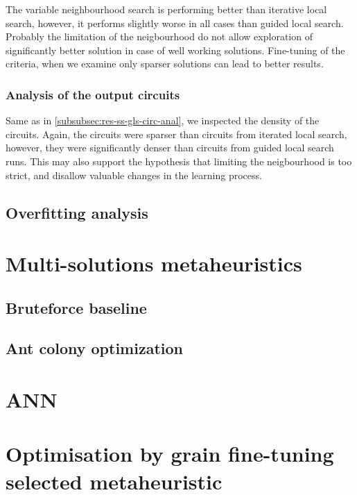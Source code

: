 \documentclass[
  print, %
  Table,   %
  nolof,     %
  nolot,     %
  11pt, %
  oneside  %
]{fithesis3}
\begin{document}
The variable neighbourhood search is performing better than iterative local search, however, it performs slightly worse in all cases than guided local search. Probably the limitation of the neigbourhood do not allow exploration of significantly better solution in case of well working solutions. Fine-tuning of the criteria, when we examine only sparser solutions can lead to better results.

\subsubsection{Analysis of the output circuits}
\label{subsubsec:res-ss-vns-circ-anal}

Same as in \cref{subsubsec:res-ss-gls-circ-anal}, we inspected the density of the circuits. Again, the circuits were sparser than circuits from iterated local search, however, they were significantly denser than circuits from guided local search runs. This may also support the hypothesis that limiting the neigbourhood is too strict, and disallow valuable changes in the learning process.

\subsection{Overfitting analysis}
\label{subsec:res-ss-overfitting}

\section{Multi-solutions metaheuristics}
\label{sec:res-ms}
\subsection{Bruteforce baseline}
\label{subsec:res-ms-bruteforce}
\subsection{Ant colony optimization}
\label{subsec:res-ms-aco}

\section{ANN}
\label{sec:res-ann}

\section{Optimisation by grain fine-tuning selected metaheuristic}
\label{sec:res-finetuning}
\end{document}
